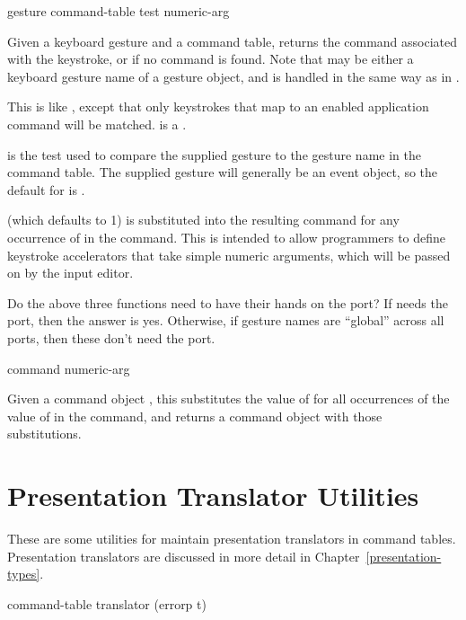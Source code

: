  {gesture command-table \key test numeric-arg}

Given a keyboard gesture  and a command table, returns the command
associated with the keystroke, or  if no command is found.  Note
that  may be either a keyboard gesture name of a gesture object,
and is handled in the same way as in .
\ReadOnly

This is like , except that only keystrokes that map to
an enabled application command will be matched.   is a
.

 is the test used to compare the supplied gesture to the gesture name
in the command table.  The supplied gesture will generally be an event object,
so the default for  is .

 (which defaults to 1) is substituted into the resulting
command for any occurrence of  in the command.
This is intended to allow programmers to define keystroke accelerators that take
simple numeric arguments, which will be passed on by the input editor.

 {Do the above three functions need to have their hands on the port?
If  needs the port, then the answer is yes.
Otherwise, if gesture names are ``global'' across all ports, then these don't
need the port.}

 {command numeric-arg}

Given a command object , this substitutes the value of
 for all occurrences of the value of
 in the command, and returns a command object
with those substitutions.


\section {Presentation Translator Utilities}

These are some utilities for maintain presentation translators in
command tables.  Presentation translators are discussed in more detail
in Chapter~\ref{presentation-types}.


 {command-table translator
                                                       \key (errorp t)}

